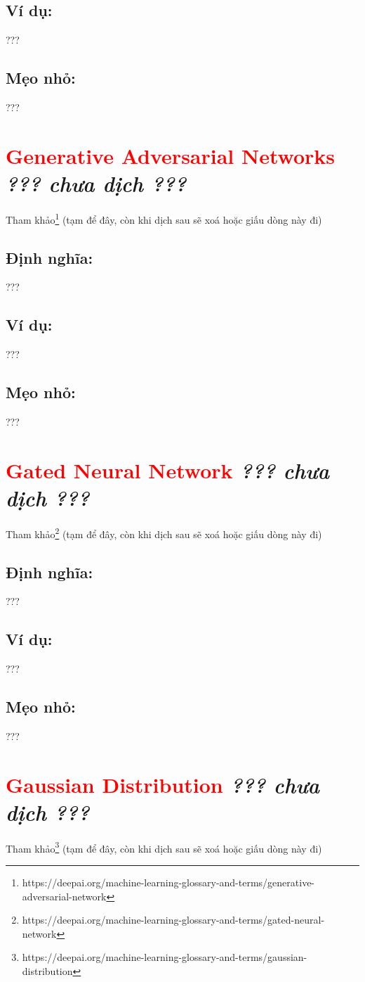 \subsection*{Ví dụ:}
???
\subsection*{Mẹo nhỏ:}
???
\section*{\huge \textcolor{Red}{Generative Adversarial Networks}  \small \textit{??? chưa dịch ???} }
Tham khảo\footnote{https://deepai.org/machine-learning-glossary-and-terms/generative-adversarial-network} (tạm để đây, còn khi dịch sau sẽ xoá hoặc giấu dòng này đi)
\subsection*{Định nghĩa:}
???
\subsection*{Ví dụ:}
???
\subsection*{Mẹo nhỏ:}
???
\section*{\huge \textcolor{Red}{Gated Neural Network}  \small \textit{??? chưa dịch ???} }
Tham khảo\footnote{https://deepai.org/machine-learning-glossary-and-terms/gated-neural-network} (tạm để đây, còn khi dịch sau sẽ xoá hoặc giấu dòng này đi)
\subsection*{Định nghĩa:}
???
\subsection*{Ví dụ:}
???
\subsection*{Mẹo nhỏ:}
???
\section*{\huge \textcolor{Red}{Gaussian Distribution}  \small \textit{??? chưa dịch ???} }
Tham khảo\footnote{https://deepai.org/machine-learning-glossary-and-terms/gaussian-distribution} (tạm để đây, còn khi dịch sau sẽ xoá hoặc giấu dòng này đi)
